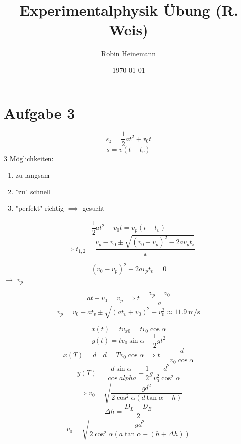 \documentclass[11pt]{article}
\author{Robin Heinemann}
\date{\today}
\title{Experimentalphysik Übung (R. Weis)}
\begin{document}
\maketitle
\tableofcontents


\section{Aufgabe 3}
\label{sec-1}
\[s_z = \frac{1}{2}a t^2 + v_0 t\]
\[s = v(t - t_v)\]
3 Möglichkeiten:
\begin{enumerate}
\item zu langsam
\item "zu" schnell
\item "perfekt" richtig $\implies$ gesucht
\end{enumerate}

\[\frac{1}{2}a t^2 + v_0 t = v_p (t - t_v)\]
\[\implies t_{1,2} = \frac{v_p - v_0 \pm \sqrt{(v_0 - v_p)^2 - 2 a v_p t_v}}{a}\]

\[(v_0 - v_p)^2 - 2 a v_p t_v = 0\]
$\rightarrow$ $v_p$

\[a t + v_0 = v_p \implies t = \frac{v_p - v_0}{a}\]
\[v_p = v_0 + at_v \pm \sqrt{(at_v + v_0)^2 - v_0^2} \approx \SI{11.9}{\meter\per\second}\]

\[x(t) = t v_{x0} = t v_0 \cos{\alpha}\]
\[y(t) = t v_0 \sin{\alpha} - \frac{1}{2}gt^2\]
\[x(T) = d\quad d = T v_0 \cos{\alpha} \implies t = \frac{d}{v_0 \cos{\alpha}}\]
\[y(T) = \frac{d \sin{\alpha}}{\cos{alpha}} - \frac{1}{2} g \frac{d^2}{v_0^2 \cos^2{\alpha}}\]
\[\implies v_0 = \sqrt{\frac{g d^2}{2\cos^2\alpha(d\tan\alpha - h)}}\]
\[\Delta h = \frac{D_L - D_B}{2}\]
\[v_0 = \sqrt{\frac{g d^2}{2\cos^2\alpha(a\tan \alpha - (h + \Delta h))}}\]
\end{document}
